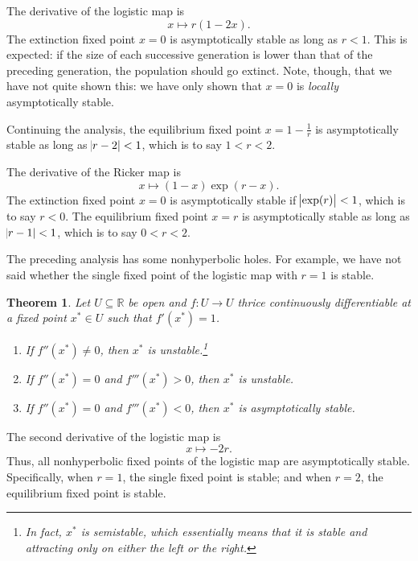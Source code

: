 \documentclass{article}
\newcommand{\reals}{\mathbb{R}}
\theoremstyle{plain}
\newtheorem{theorem}{Theorem}
\theoremstyle{definition}
\begin{document}
\begin{example}
  The derivative of the logistic map is
  \[
    x \mapsto r(1 - 2x).
  \]
  The extinction fixed point \(x = 0\) is asymptotically stable as long as \(r < 1\). This is expected: if the size of each successive generation is lower than that of the preceding generation, the population should go extinct. Note, though, that we have not quite shown this: we have only shown that \(x = 0\) is \emph{locally} asymptotically stable.

  Continuing the analysis, the equilibrium fixed point \(x = 1 - \frac{1}{r}\) is asymptotically stable as long as \(\abs{r - 2} < 1\), which is to say \(1 < r < 2\).
\end{example}

\begin{example}
  The derivative of the Ricker map is
  \[
    x \mapsto (1 - x)\exp(r - x).
  \]
  The extinction fixed point \(x = 0\) is asymptotically stable if \(\abs{\exp(r)} < 1\), which is to say \(r < 0\). The equilibrium fixed point \(x = r\) is asymptotically stable as long as \(\abs{r - 1} < 1\), which is to say \(0 < r < 2\).
\end{example}

The preceding analysis has some nonhyperbolic holes. For example, we have not said whether the single fixed point of the logistic map with \(r = 1\) is stable.

\begin{theorem}\label{theorem:derivative-1-stability}
  Let \(U \subseteq \reals\) be open and \(f : U \to U\) thrice continuously differentiable at a fixed point \(x^* \in U\) such that \(f'(x^*) = 1\).
  \begin{enumerate}
  \item If \(f''(x^*) \ne 0\), then \(x^*\) is unstable.\footnote{In fact, \(x^*\) is \emph{semistable}, which essentially means that it is stable and attracting only on either the left or the right.}
  \item If \(f''(x^*) = 0\) and \(f'''(x^*) > 0\), then \(x^*\) is unstable.
  \item If \(f''(x^*) = 0\) and \(f'''(x^*) < 0\), then \(x^*\) is asymptotically stable.
  \end{enumerate}
\end{theorem}

\begin{example}
  The second derivative of the logistic map is
  \[
    x \mapsto -2r.
  \]
  Thus, all nonhyperbolic fixed points of the logistic map are asymptotically stable. Specifically, when \(r = 1\), the single fixed point is stable; and when \(r = 2\), the equilibrium fixed point is stable.
\end{example}
\end{document}
